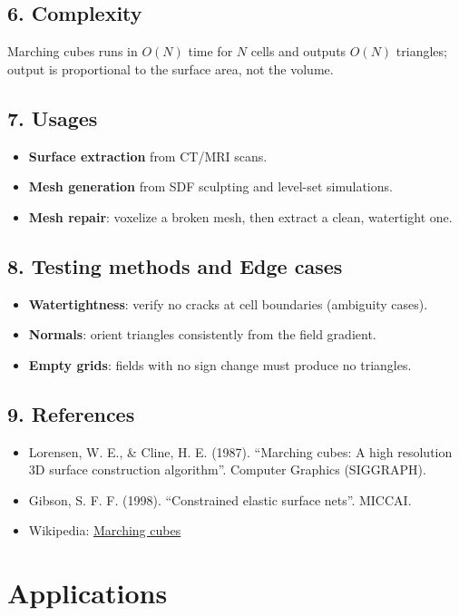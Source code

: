 \subsection{6. Complexity}
Marching cubes runs in $O(N)$ time for $N$ cells and outputs $O(N)$
triangles; output is proportional to the surface area, not the volume.

\subsection{7. Usages}
\begin{itemize}
    \item \textbf{Surface extraction} from CT/MRI scans.
    \item \textbf{Mesh generation} from SDF sculpting and level-set simulations.
    \item \textbf{Mesh repair}: voxelize a broken mesh, then extract a clean, watertight one.
\end{itemize}

\subsection{8. Testing methods and Edge cases}
\begin{itemize}
    \item \textbf{Watertightness}: verify no cracks at cell boundaries (ambiguity cases).
    \item \textbf{Normals}: orient triangles consistently from the field gradient.
    \item \textbf{Empty grids}: fields with no sign change must produce no triangles.
\end{itemize}

\subsection{9. References}
\begin{itemize}
    \item Lorensen, W. E., \& Cline, H. E. (1987). ``Marching cubes: A high resolution 3D surface construction algorithm''. Computer Graphics (SIGGRAPH).
    \item Gibson, S. F. F. (1998). ``Constrained elastic surface nets''. MICCAI.
    \item Wikipedia: \href{https://en.wikipedia.org/wiki/Marching_cubes}{Marching cubes}
\end{itemize}

\section{Applications}
\label{sec:voxel_applications}

